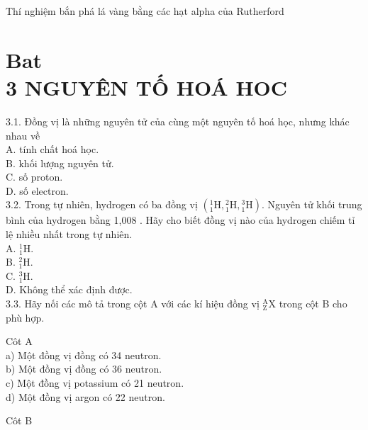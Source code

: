 \documentclass[10pt]{article}
\begin{document}
Thí nghiệm bắn phá lá vàng bằng các hạt alpha của Rutherford

\section*{Bat \\
 3 NGUYÊN TỐ HOÁ HOC}
3.1. Đồng vị là những nguyên tử của cùng một nguyên tố hoá học, nhưng khác nhau về\\
A. tính chất hoá học.\\
B. khối lượng nguyên tử.\\
C. số proton.\\
D. số electron.\\
3.2. Trong tự nhiên, hydrogen có ba đồng vị $\left({ }_{1}^{1} \mathrm{H},{ }_{1}^{2} \mathrm{H},{ }_{1}^{3} \mathrm{H}\right)$. Nguyên tử khối trung bình của hydrogen bằng 1,008 . Hãy cho biết đồng vị nào của hydrogen chiếm tỉ lệ nhiều nhất trong tự nhiên.\\
A. ${ }_{1}^{1} \mathrm{H}$.\\
B. ${ }_{1}^{2} \mathrm{H}$.\\
C. ${ }_{1}^{3} \mathrm{H}$.\\
D. Không thể xác định được.\\
3.3. Hãy nối các mô tả trong cột A với các kí hiệu đồng vị ${ }_{\mathrm{Z}}^{\mathrm{A}} \mathrm{X}$ trong cột B cho phù hợp.

Côt A\\
a) Một đồng vị đồng có 34 neutron.\\
b) Một đồng vị đồng có 36 neutron.\\
c) Một đồng vị potassium có 21 neutron.\\
d) Một đồng vị argon có 22 neutron.

Côt B
\end{document}
